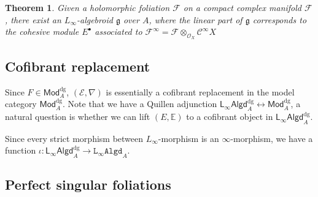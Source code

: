 \documentclass[12pt]{amsart}
\newtheorem{thm}{Theorem}[section]
\theoremstyle{definition}
\theoremstyle{remark}
\numberwithin{equation}{section}
\newcommand{\CF}{{\mathcal F}}
\newcommand{\CO}{{\mathcal O}}
\newcommand{\cinf}{{\mathcal C}^{\infty}}
\newcommand{\1}{{\mathbb{1}}}
\newcommand{\E}{{\mathcal{E}}}
\newcommand{\g}{\mathfrak{g}}
\newcommand{\lalgd}{\mathsf{L_{\infty}Algd}^{\operatorname{dg}}}
\newcommand{\lalgdi}{\mathtt{L_{\infty}Algd}}
\newcommand{\dgmod}{\mathsf{Mod}^{\operatorname{dg}}}
\begin{document}
\begin{thm}\label{holo}
	Given a holomorphic foliation $\CF$ on a compact complex manifold $\CF$ , there exist an $L_{\infty}$-algebroid $\g$ over $A$, where the linear part of $\g$ corresponds to the cohesive module $E^{\bullet}$ associated to $\CF^{\infty} = \CF\otimes_{\CO_X} \cinf{X}$
\end{thm}






\subsection{Cofibrant replacement}
Since $F \in \dgmod_A$, $(\E, \nabla)$ is essentially a cofibrant replacement in the model category $\dgmod_A$. Note that we have a Quillen adjunction $\lalgd_A\leftrightarrow \dgmod_A$, a natural question is whether we can lift $(E, \mathbb{E})$ to a cofibrant object in $\lalgd_A$.



Since every strict morphism between $L_{\infty}$-morphism is an $\infty$-morphism, we have a function $\iota: \lalgd_A \to \lalgdi_A$. 

\subsection{Perfect singular foliations}
\end{document}
